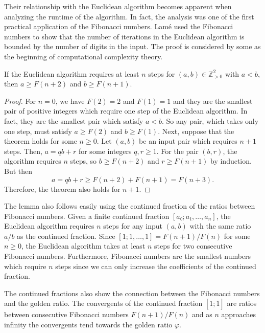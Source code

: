 Their relationship with the Euclidean algorithm becomes apparent when analyzing
the runtime of the algorithm.
In fact, the analysis was one of the first practical application of
the Fibonacci numbers.
Lamé \cite{Lame44} used the Fibonacci numbers to show that the number of
iterations in the Euclidean algorithm is bounded by the number of digits in the
input.
The proof is considered by some as the beginning of computational
complexity theory.

\begin{lemma}
  \label{thm:lame}
  If the Euclidean algorithm requires at least $n$ steps for $(a, b) ∈ ℤ_{> 0}^2$ with $a < b$,
  then $a ≥ F(n+2)$ and $b ≥ F(n+1)$.
\end{lemma}

\begin{proof}
  For $n = 0$, we have $F(2) = 2$ and $F(1) = 1$
  and they are the smallest pair of positive integers which require one step of
  the Euclidean algorithm.
  In fact, they are the smallest pair which satisfy $a < b$.
  So any pair, which takes only one step, must satisfy $a ≥ F(2)$ and $b ≥ F(1)$.
  Next, suppose that the theorem holds for some $n ≥ 0$.
  Let $(a, b)$ be an input pair which requires $n+1$ steps.
  Then, $a = qb + r$ for some integers $q, r ≥ 1$.
  For the pair $(b, r)$, the algorithm requires $n$ steps, so $b ≥ F(n+2)$ and
  $r ≥ F(n+1)$ by induction.
  But then
  \[
    a = qb + r ≥ F(n+2) + F(n+1) = F(n+3).
  \]
  Therefore, the theorem also holds for $n+1$.
\end{proof}

The lemma also follows easily using the continued fraction of the ratios
between Fibonacci numbers.
Given a finite continued fraction $[a₀; a₁, …, a_n]$, the Euclidean algorithm
requires $n$ steps for any input $(a, b)$ with the same ratio $a/b$ as the
continued fraction.
Since $[1; 1, …, 1] = F(n+1)/F(n)$ for some $n ≥ 0$, the Euclidean algorithm
takes at least $n$ steps for two consecutive Fibonacci numbers.
Furthermore, Fibonacci numbers are the smallest numbers which require $n$ steps
since we can only increase the coefficients of the continued fraction.

The continued fractions also show the connection between the Fibonacci numbers
and the golden ratio.
The convergents of the continued fraction $[1; \overline{1}]$ are ratios
between consecutive Fibonacci numbers $F(n+1)/F(n)$ and as $n$ approaches
infinity the convergents tend towards the golden ratio $φ$.

\iffalse
\begin{example}
  Consider $a = 13$ and $b = 8$.
  The algorithm proceeds as follows:
  \[
    \begin{array}{rclcrcl}
      13/8 & = & 1 & · & 5/8 & + & 3/8 \\
       5/8 & = & 1 & · & 3/8 & + & 2/8 \\
       3/8 & = & 1 & · & 2/8 & + & 1/8 \\
       2/8 & = & 2 & · & 1/8 & + & 0.
    \end{array}
  \]
\end{example}
\fi

